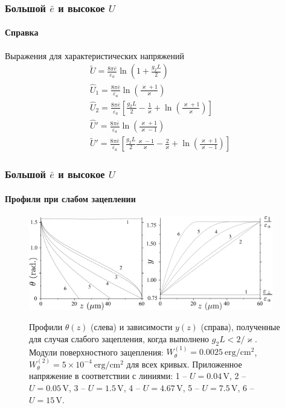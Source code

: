 \documentclass[utf8,secheader]{beamer}
\begin{document}
\begin{frame}
\frametitle{Большой $\bar{e}$ и высокое $U$}
\framesubtitle{Справка}
\begin{block}{Выражения для характеристических напряжений}
\begin{align}
&\widetilde{U} = \frac{8\pi\bar{e}}{\varepsilon_a} \ln{\left( 1 + \frac{g_2 L}{2} \right)} \\
&\hat{U}_1 = \frac{8\pi\bar{e}}{\varepsilon_a} \ln{\left(\frac{\varkappa+1}{\varkappa} \right)}\\
&\hat{U}_2 = \frac{8\pi\bar{e}}{\varepsilon_a} \left[\frac{g_2 L}{2} - \frac{1}{\varkappa} + \ln{\left(\frac{\varkappa+1}{\varkappa} \right)} \right]\\
&\hat{U}' = \frac{8\pi\bar{e}}{\varepsilon_a} \ln{\left(\frac{\varkappa+1}{\varkappa - 1} \right)}\\
&\widetilde{U}' = \frac{8\pi\bar{e}}{\varepsilon_a} \left[\frac{g_2 L}{2}\frac{\varkappa - 1}{\varkappa} - \frac{2}{\varkappa} + \ln{\left(\frac{\varkappa+1}{\varkappa - 1} \right)} \right]
\end{align}
\end{block}
\end{frame}

\begin{frame}
\frametitle{Большой $\bar{e}$ и высокое $U$}
\framesubtitle{Профили при слабом зацеплении}
\begin{figure}[h]
\includegraphics[width=0.45\textwidth]{Fig1_theta_low_anchoring.eps}%
\hfill
\includegraphics[width = 0.49\textwidth]{Fig1_y_low_anchoring.eps}
\caption{\footnotesize Профили $\theta(z)$ (слева) и зависимости $y(z)$ (справа), полученные для случая слабого зацепления, когда выполнено $g_2 L < 2/\varkappa$. Модули поверхностного зацепления: $W_\theta^{(1)}=0.0025\ \mathrm{erg}/\mathrm{cm}^2$, $W_\theta^{(2)} = 5\times 10^{-4}\ \mathrm{erg}/\mathrm{cm}^2$ для всех кривых. Приложенное напряжение в соответствии с линиями: 1 -- $U = 0.04\,\mathrm{V}$, 2 -- $U = 0.05\,\mathrm{V}$, 3 -- $U = 1.5\,\mathrm{V}$, 4 -- $U = 4.67\,\mathrm{V}$, 5 -- $U = 7.5\,\mathrm{V}$, 6 -- $U = 15\,\mathrm{V}$.}
\end{figure}
\end{frame}
\end{document}
